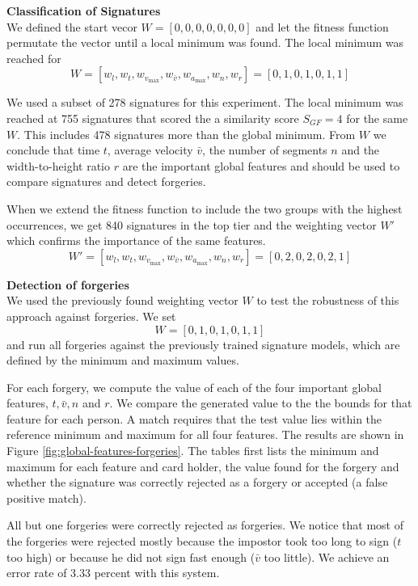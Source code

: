 \documentclass[a4paper, oneside]{csthesis}
\begin{document}
\textbf{Classification of Signatures}\\
We defined the start vecor $W = [0,0,0,0,0,0,0]$ and let the fitness function permutate the vector until a local minimum was found. The local minimum was reached for $$W = [w_l, w_t, w_{v_\text{max}}, w_{\bar{v}}, w_{a_\text{max}}, w_n, w_r] = [0, 1, 0, 1, 0, 1, 1]$$


We used a subset of 278 signatures for this experiment. The local minimum was reached at 755 signatures that scored the a similarity score $S_{GF} =4$ for the same $W$. This includes 478 signatures more than the global minimum.
From $W$ we conclude that time $t$, average velocity $\bar{v}$, the number of segments $n$ and the width-to-height ratio $r$ are the important global features and should be used to compare signatures and detect forgeries.

When we extend the fitness function to include the two groups with the highest occurrences, we get 840 signatures in the top tier and the weighting vector $W'$ which confirms the importance of the same features.
$$W' = [w_l, w_t, w_{v_\text{max}}, w_{\bar{v}}, w_{a_\text{max}}, w_n, w_r] = [0, 2, 0, 2, 0, 2, 1]$$



\textbf{Detection of forgeries}\\
We used the previously found weighting vector $W$ to test the robustness of this approach against forgeries. We set $$W = [0, 1, 0, 1, 0, 1, 1]$$
and run all forgeries against the previously trained signature models, which are defined by the minimum and maximum values.

For each forgery, we compute the value of each of the four important global features, $t, \bar{v}, n$ and $r$. We compare the generated value to the the bounds for that feature for each person. A match requires that the test value lies within the reference minimum and maximum for all four features. The results are shown in Figure \ref{fig:global-features-forgeries}. The tables first lists the minimum and maximum for each feature and card holder, the value found for the forgery and whether the signature was correctly rejected as a forgery or accepted (a false positive match).

All but one forgeries were correctly rejected as forgeries. We notice that most of the forgeries were rejected mostly because the impostor took too long to sign ($t$ too high) or because he did not sign fast enough ($\bar{v}$ too little). We achieve an error rate of 3.33 percent with this system.
\end{document}

